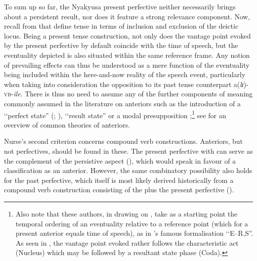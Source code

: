 To sum up so far, the Nyakyusa present perfective neither necessarily brings about a persistent result, nor does it feature a strong relevance component. Now, recall from  that \citeauthor{BotneRKershnerT2008} define tense in terms of inclusion and exclusion of the deictic locus. Being a present tense construction, not only does the vantage point evoked by the present perfective by default coincide with the time of speech, but the eventuality depicted is also situated within the same reference frame. Any notion of prevailing effects can thus be understood as a mere function of the eventuality being included within the here-and-now reality of the speech event, particularly when taking into consideration the opposition to its past tense counterpart \mbox{a(\textit{lɪ})-}\textsc{vb}\mbox{-\textit{ile}}. There is thus no need to assume any of the further components of meaning commonly assumed in the literature on anteriors such as the introduction of a \lq\lq perfect state'' (\citealt{MoensM1987}; \citealt{MoensMSteedmanM1988}), \lq\lq result state'' \citep{KampHReyleU1993} or a modal presupposition \citep{PortnerP2003};\footnote{Also note that these authors, in drawing on \citet{ReichenbachH1947}, take as a starting point the temporal ordering of an eventuality relative to a reference point (which for a present anterior equals time of speech), as in \citeauthor{ReichenbachH1947}'s famous formalisation \lq\lq E--R,S''. As seen in , the vantage point evoked rather follows the characteristic act (Nucleus) which may be followed by a resultant state phase (Coda).} see \citet{RitzM2012} for an overview of common theories of anteriors.

\largerpage
Nurse's second criterion concerns compound verb constructions. Anteriors, but not perfectives, should be found in these. The present perfective with  can serve as the complement of the persistive aspect  (), which would speak in favour of a classification as an anterior. However, the same combinatory possibility also holds for the past perfective, which itself is most likely derived historically from a compound verb construction consisting of the  plus the present perfective ().

